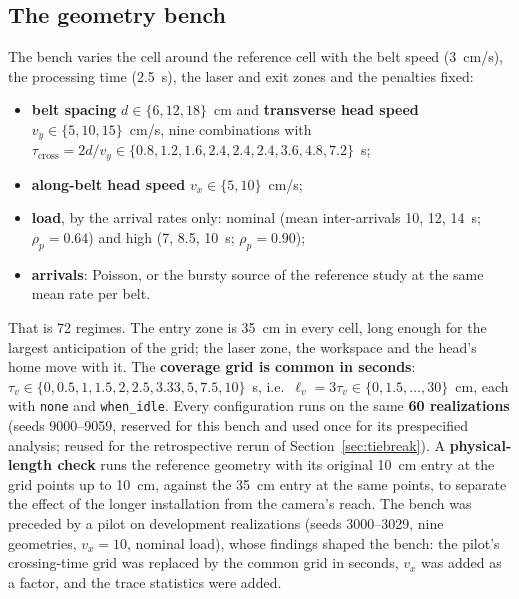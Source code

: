 \documentclass[11pt,a4paper]{article}
\newcommand{\tcross}{\tau_{\mathrm{cross}}}
\newcommand{\tv}{\tau_{v}}
\newcommand{\lv}{\ell_{v}}
\begin{document}
\subsection{The geometry bench}\label{sec:bench}
The bench varies the cell around the reference cell with the belt speed (3~cm/s), the
processing time (2.5~s), the laser and exit zones and the penalties fixed:
\begin{itemize}[nosep]
\item \textbf{belt spacing} $d\in\{6,12,18\}$~cm and \textbf{transverse head speed}
  $v_y\in\{5,10,15\}$~cm/s, nine combinations with
  $\tcross=2d/v_y\in\{0.8,1.2,1.6,2.4,2.4,2.4,3.6,4.8,7.2\}$~s;
\item \textbf{along-belt head speed} $v_x\in\{5,10\}$~cm/s;
\item \textbf{load}, by the arrival rates only: nominal (mean inter-arrivals 10, 12, 14~s;
  $\rho_p=0.64$) and high (7, 8.5, 10~s; $\rho_p=0.90$);
\item \textbf{arrivals}: Poisson, or the bursty source of the reference study at the same
  mean rate per belt.
\end{itemize}
That is 72 regimes. The entry zone is 35~cm in every cell, long enough for the largest
anticipation of the grid; the laser zone, the workspace and the head's home move with it.
The \textbf{coverage grid is common in seconds}: $\tv\in\{0,0.5,1,1.5,2,2.5,3.33,5,7.5,
10\}$~s, i.e.\ $\lv=3\tv\in\{0,1.5,\dots,30\}$~cm, each with \texttt{none} and
\texttt{when\_idle}. Every configuration runs on the same \textbf{60 realizations}
(seeds 9000--9059, reserved for this bench and used once for its prespecified analysis;
reused for the retrospective rerun of Section~\ref{sec:tiebreak}). A \textbf{physical-length
check} runs the reference geometry with its original 10~cm entry at the grid points up to
10~cm, against the 35~cm entry at the same points, to separate the effect of the longer
installation from the camera's reach. The bench was preceded by a pilot on development
realizations (seeds 3000--3029, nine geometries, $v_x=10$, nominal load), whose findings
shaped the bench: the pilot's crossing-time grid was replaced by the common grid in
seconds, $v_x$ was added as a factor, and the trace statistics were added.
\end{document}
